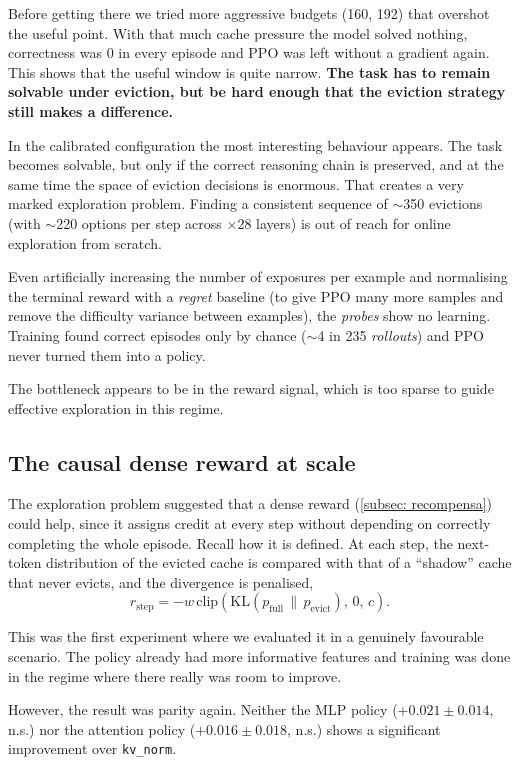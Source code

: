 Before getting there we tried more aggressive budgets (160, 192) that overshot the useful point. With that much cache pressure the model solved nothing, correctness was $0$ in every episode and PPO was left without a gradient again. This shows that the useful window is quite narrow. \textbf{The task has to remain solvable under eviction, but be hard enough that the eviction strategy still makes a difference.}

In the calibrated configuration the most interesting behaviour appears. The task becomes solvable, but only if the correct reasoning chain is preserved, and at the same time the space of eviction decisions is enormous. That creates a very marked exploration problem. Finding a consistent sequence of $\sim$350 evictions (with $\sim$220 options per step across $\times28$ layers) is out of reach for online exploration from scratch.

Even artificially increasing the number of exposures per example and normalising the terminal reward with a \textit{regret} baseline (to give PPO many more samples and remove the difficulty variance between examples), the \textit{probes} show no learning. Training found correct episodes only by chance ($\sim$4 in 235 \textit{rollouts}) and PPO never turned them into a policy.

The bottleneck appears to be in the reward signal, which is too sparse to guide effective exploration in this regime.

\subsection{The causal dense reward at scale} \label{subsec: e8}

The exploration problem suggested that a dense reward (\cref{subsec: recompensa}) could help, since it assigns credit at every step without depending on correctly completing the whole episode. Recall how it is defined. At each step, the next-token distribution of the evicted cache is compared with that of a ``shadow'' cache that never evicts, and the divergence is penalised,
\[
r_{\text{step}} = -w\,\mathrm{clip}\!\left(\mathrm{KL}(p_{\text{full}}\,\|\,p_{\text{evict}}),\,0,\,c\right).
\]

This was the first experiment where we evaluated it in a genuinely favourable scenario. The policy already had more informative features and training was done in the regime where there really was room to improve.

However, the result was parity again. Neither the MLP policy ($+0.021\pm0.014$, n.s.) nor the attention policy ($+0.016\pm0.018$, n.s.) shows a significant improvement over \texttt{kv\_norm}.

